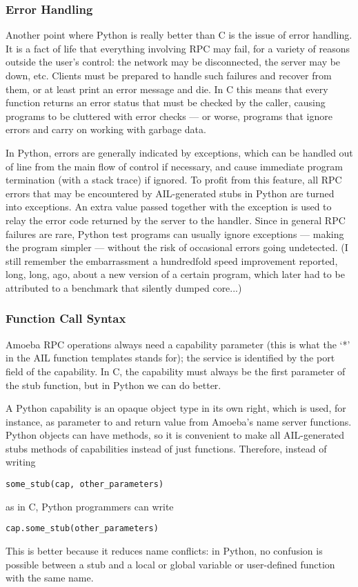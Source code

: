 \subsubsection{Error Handling}

Another point where Python is really better than C is the issue of
error handling.  It is a fact of life that everything involving RPC
may fail, for a variety of reasons outside the user's control: the
network may be disconnected, the server may be down, etc.  Clients
must be prepared to handle such failures and recover from them, or at
least print an error message and die.  In C this means that every
function returns an error status that must be checked by the caller,
causing programs to be cluttered with error checks --- or worse,
programs that ignore errors and carry on working with garbage data.

In Python, errors are generally indicated by exceptions, which can be
handled out of line from the main flow of control if necessary, and
cause immediate program termination (with a stack trace) if ignored.
To profit from this feature, all RPC errors that may be encountered by
AIL-generated stubs in Python are turned into exceptions.  An extra
value passed together with the exception is used to relay the error
code returned by the server to the handler.  Since in general RPC
failures are rare, Python test programs can usually ignore exceptions
--- making the program simpler --- without the risk of occasional
errors going undetected.  (I still remember the embarrassment a
hundredfold speed improvement reported, long, long, ago, about a new
version of a certain program, which later had to be attributed to a
benchmark that silently dumped core...)

\subsubsection{Function Call Syntax}

Amoeba RPC operations always need a capability parameter (this is what
the `*' in the AIL function templates stands for); the service is
identified by the port field of the capability.  In C, the capability
must always be the first parameter of the stub function, but in Python
we can do better.

A Python capability is an opaque object type in its own right, which
is used, for instance, as parameter to and return value from Amoeba's
name server functions.  Python objects can have methods, so it is
convenient to make all AIL-generated stubs methods of capabilities
instead of just functions.  Therefore, instead of writing
\begin{verbatim}
some_stub(cap, other_parameters)
\end{verbatim}
as in C, Python programmers can write
\begin{verbatim}
cap.some_stub(other_parameters)
\end{verbatim}
This is better because it reduces name conflicts: in Python, no
confusion is possible between a stub and a local or global variable or
user-defined function with the same name.

